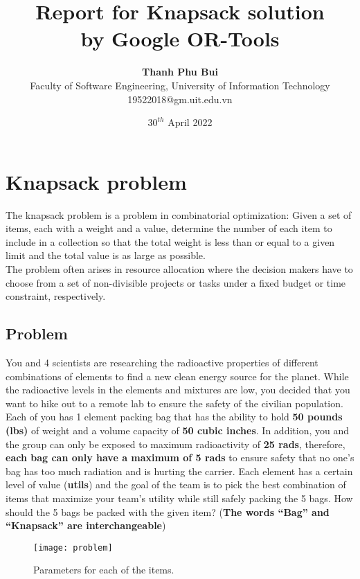 \documentclass{article}
\title{\textbf{Report for Knapsack solution}\\ by Google OR-Tools}
\author{\textbf{Thanh Phu Bui}\\
Faculty of Software Engineering, University of Information Technology\\
\small 19522018@gm.uit.edu.vn }
\date{$30^{th}$ April 2022}
\begin{document}
\maketitle

\section{Knapsack problem}
The knapsack problem is a problem in combinatorial optimization: Given a set of items, each with a weight and a value, determine the number of each item to include in a collection so that the total weight is less than or equal to a given limit and the total value is as large as possible.\\

The problem often arises in resource allocation where the decision makers have to choose from a set of non-divisible projects or tasks under a fixed budget or time constraint, respectively.

\subsection{Problem}
You and 4 scientists are researching the radioactive properties of different combinations of elements to find a new clean energy source for the planet. While the radioactive levels in the elements and mixtures are low, you decided that you want to hike out to a remote lab to ensure the safety of the civilian population. Each of you has 1 element packing bag that has the ability to hold \textbf{50 pounds (lbs)} of weight and a volume capacity of \textbf{50 cubic inches}. In addition, you and the group can only be exposed to maximum radioactivity of \textbf{25 rads}, therefore, \textbf{each bag can only have a maximum of 5 rads} to ensure safety that no one’s bag has too much radiation and is hurting the carrier. Each element has a certain level of value (\textbf{utils}) and the goal of the team is to pick the best combination of items that maximize your team's utility while still safely packing the 5 bags. How should the 5 bags be packed with the given item? (\textbf{The words “Bag” and “Knapsack” are interchangeable})
\begin{center}
    \begin{figure}[htp]
    \begin{center}
     \texttt{[image: problem]}
    \end{center}
    \caption{Parameters for each of the items.}
    \label{refPic1}
    \end{figure}
\end{center}
\end{document}
